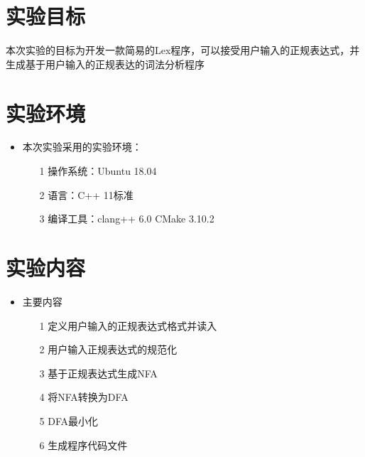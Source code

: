 \section{实验目标}
本次实验的目标为开发一款简易的Lex程序，可以接受用户输入的正规表达式，并生成基于用户输入的正规表达的词法分析程序
\section{实验环境}
\begin{itemize}
    \item 本次实验采用的实验环境：
    \begin{itemize}
        \item[1]操作系统：Ubuntu 18.04
        \item[2]语言：C++ 11标准
        \item[3]编译工具：clang++ 6.0 CMake 3.10.2
    \end{itemize}
\end{itemize}
\section{实验内容}
\begin{itemize}
    \item 主要内容
    \begin{itemize}
        \item[1]定义用户输入的正规表达式格式并读入
        \item[2]用户输入正规表达式的规范化
        \item[3]基于正规表达式生成NFA
        \item[4]将NFA转换为DFA
        \item[5]DFA最小化
        \item[6]生成程序代码文件
    \end{itemize}
\end{itemize}
